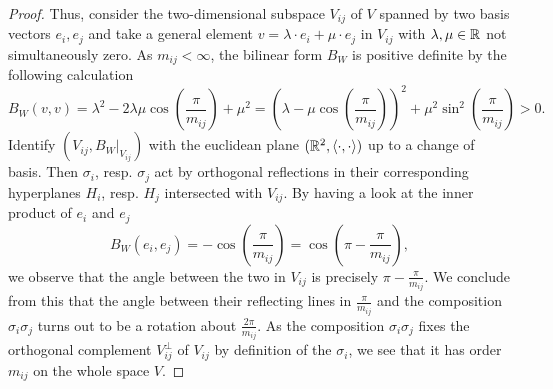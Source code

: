 \begin{proof}
    Thus, consider the two-dimensional subspace \(V_{ij}\) of \(V\) spanned by two basis vectors \(e_i, e_j\) and take a general element \(v = \lambda \cdot e_i + \mu \cdot e_j\) in \(V_{ij}\) with \(\lambda, \mu \in \mathbb{R}\) not simultaneously zero.
    As \(m_{ij} < \infty\), the bilinear form \(B_W\) is positive definite by the following calculation
    \[B_W (v,v) = \lambda^2 - 2\lambda\mu\cos\left(\frac{\pi}{m_{ij}}\right) + \mu^2 = \left(\lambda - \mu \cos\left(\frac{\pi}{m_{ij}}\right)\right)^2 + \mu^2\sin^2\left(\frac{\pi}{m_{ij}}\right) > 0.\]
    Identify \((V_{ij}, B_W\vert_{V_{ij}})\) with the euclidean plane \((\mathbb{R}^2, \langle \cdot, \cdot \rangle)\) up to a change of basis.
    Then \(\sigma_i\), resp. \(\sigma_j\) act by orthogonal reflections in their corresponding hyperplanes \(H_i\), resp. \(H_j\) intersected with \(V_{ij}\).
    By having a look at the inner product of \(e_i\) and \(e_j\)
    \[B_W(e_i, e_j) = - \cos\left(\frac{\pi}{m_{ij}}\right) = \cos\left(\pi - \frac{\pi}{m_{ij}}\right),\]
    we observe that the angle between the two in \(V_{ij}\) is precisely \(\pi - \frac{\pi}{m_{ij}}\).
    We conclude from this that the angle between their reflecting lines in \(\frac{\pi}{m_{ij}}\) and the composition \(\sigma_i\sigma_j\) turns out to be a rotation about \(\frac{2\pi}{m_{ij}}\).
    As the composition \(\sigma_i\sigma_j\) fixes the orthogonal complement \(V_{ij}^\perp\) of \(V_{ij}\) by definition of the \(\sigma_i\), we see that it has order \(m_{ij}\) on the whole space \(V\).

\end{proof}
